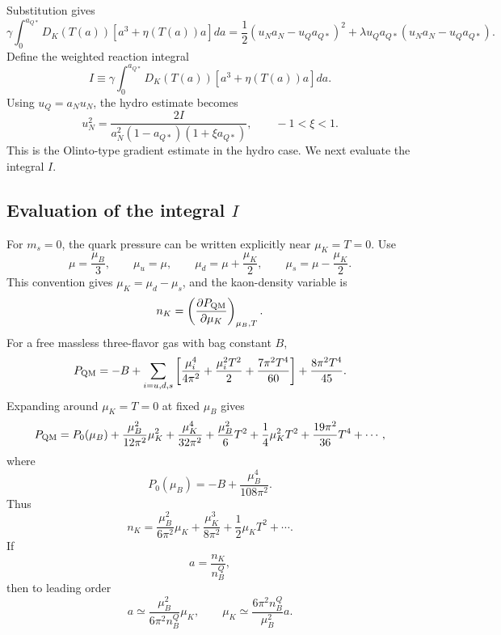 Substitution gives
\begin{equation}
\gamma
\int_0^{a_{Q*}}
D_K(T(a))
\left[a^3+\eta(T(a))a\right] da
=
\frac{1}{2}
\left(u_Na_N-u_Qa_{Q*}\right)^2
+
\lambda u_Qa_{Q*}
\left(u_Na_N-u_Qa_{Q*}\right).
\end{equation}
Define the weighted reaction integral
\begin{equation}
I\equiv
\gamma
\int_0^{a_{Q*}}
D_K(T(a))
\left[a^3+\eta(T(a))a\right]da .
\end{equation}
Using \(u_Q=a_Nu_N\), the hydro estimate becomes
\begin{equation}
u_N^2
=
\frac{
2I
}{
a_N^2\left(1-a_{Q*}\right)\left(1+\xi a_{Q*}\right)
},
\qquad
-1<\xi<1 .
\end{equation}
This is the Olinto-type gradient estimate in the hydro case. We next evaluate
the integral \(I\).

\subsection{Evaluation of the integral \(I\)}
\label{sec:massless-integral}

For \(m_s=0\), the quark pressure can be written explicitly near
\(\mu_K=T=0\). Use
\begin{equation}
\mu=\frac{\mu_B}{3},\qquad
\mu_u=\mu,\qquad
\mu_d=\mu+\frac{\mu_K}{2},\qquad
\mu_s=\mu-\frac{\mu_K}{2}.
\end{equation}
This convention gives \(\mu_K=\mu_d-\mu_s\), and the kaon-density variable is
\begin{equation}
n_K=\left(\frac{\partial P_{\rm QM}}{\partial \mu_K}\right)_{\mu_B,T}.
\end{equation}
For a free massless three-flavor gas with bag constant \(B\),
\begin{equation}
P_{\rm QM}
=
-B
+
\sum_{i=u,d,s}
\left[
\frac{\mu_i^4}{4\pi^2}
+
\frac{\mu_i^2T^2}{2}
+
\frac{7\pi^2T^4}{60}
\right]
+
\frac{8\pi^2T^4}{45}.
\end{equation}
Expanding around \(\mu_K=T=0\) at fixed \(\mu_B\) gives
\begin{equation}
P_{\rm QM}
=
P_0(\mu_B)
+
\frac{\mu_B^2}{12\pi^2}\mu_K^2
+
\frac{\mu_K^4}{32\pi^2}
+
\frac{\mu_B^2}{6}T^2
+
\frac{1}{4}\mu_K^2T^2
+
\frac{19\pi^2}{36}T^4
+\cdots ,
\end{equation}
where
\begin{equation}
P_0(\mu_B)=-B+\frac{\mu_B^4}{108\pi^2}.
\end{equation}
Thus
\begin{equation}
n_K
=
\frac{\mu_B^2}{6\pi^2}\mu_K
+
\frac{\mu_K^3}{8\pi^2}
+
\frac{1}{2}\mu_KT^2
+\cdots .
\end{equation}
If
\begin{equation}
a=\frac{n_K}{n_B^Q},
\end{equation}
then to leading order
\begin{equation}
a\simeq
\frac{\mu_B^2}{6\pi^2 n_B^Q}\mu_K,
\qquad
\mu_K\simeq
\frac{6\pi^2 n_B^Q}{\mu_B^2}a .
\end{equation}

